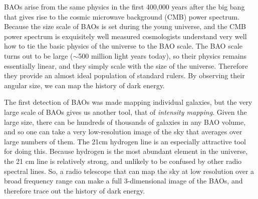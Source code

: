 \documentclass[letterpaper,11pt,preprint]{aastex}
\begin{document}
BAOs arise from the same physics in the first 400,000 years after the
big bang that gives rise to the cosmic microwave background (CMB)
power spectrum.  Because the size scale of BAOs is set during the
young universe, and the CMB power spectrum is exquisitely well
measured \citep{PlanckSpectra2015,Louis2017,Henning2018} cosmologists
understand very well how to tie the basic physics of the universe to
the BAO scale.  The BAO scale turns out to be large ($\sim$500 million
light years today), so their physics remains essentially linear, and
they simply scale with the size of the universe.  Therefore they
provide an almost ideal population of standard rulers. By observing
their angular size, we can map the history of dark energy.

The first detection of BAOs \citep{Eisenstein05} was made mapping
individual galaxies, but the very large scale of BAOs gives us another
tool, that of {\textit{intensity mapping}}.  Given the large size,
there can be hundreds of thousands of galaxies in any BAO volume, and
so one can take a very low-resolution image of the sky that averages
over large numbers of them.  The 21cm hydrogen line is an especially
attractive tool for doing this.  Because hydrogen is the most abundant
element in the universe, the 21 cm line is relatively strong, and
unlikely to be confused by other radio spectral lines.  So, a radio
telescope that can map the sky at low resolution over a broad
frequency range can make a full 3-dimensional image of the BAOs, and
therefore trace out the history of dark energy.
\end{document}
